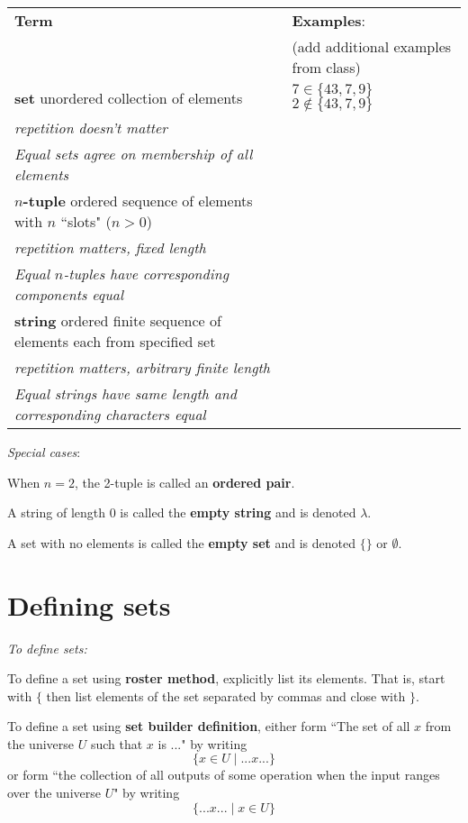\documentclass[12pt, oneside]{article}
\begin{document}
\begin{center}
    \begin{tabular}{p{4.6in}p{2.6in}}
    {\bf  Term} & {\bf Examples}:\\
    &  (add additional examples from class)\\
    \hline 
    {\bf set} \newline
    unordered collection of elements & $7 \in \{43, 7, 9 \}$ \qquad $2 \notin \{43, 7, 9 \}$ \\
    {\it repetition doesn't matter} & \\
    {\it Equal sets agree on membership of all elements}& \\
    \hline
    {\bf $n$-tuple} \newline
    ordered sequence of elements with $n$ ``slots" ($n >0$) & \\
    {\it repetition matters, fixed length} &\\
    {\it Equal $n$-tuples have corresponding components equal}& \\
    \hline
    {\bf string} \newline
    ordered finite sequence of elements each from specified
    set & \\
    {\it repetition matters, arbitrary finite length} &\\
    {\it Equal strings have same length and corresponding characters equal}
    \end{tabular}
\end{center}

{\it Special cases}: 

When $n=2$, the 2-tuple is called an {\bf ordered pair}.

A string of length $0$ is called the {\bf empty string} and is denoted $\lambda$.

A set with no elements is called the {\bf empty set} and is denoted $\{\}$ or $\emptyset$. \vfill
\section*{Defining sets}


{\it To define sets:}

To define a set using {\bf roster method}, explicitly list its elements. That is,
start with $\{$ then list elements of 
the set separated by commas and close with $\}$.

To define a set using {\bf set builder definition}, either form 
``The set of all $x$ from the universe $U$ such that $x$ is ..." by writing
\[\{x \in U \mid ...x... \}\]
or form ``the collection of all outputs of some operation when the input ranges over the universe $U$"
by writing
\[\{ ...x... \mid x\in U \}\]
\end{document}
